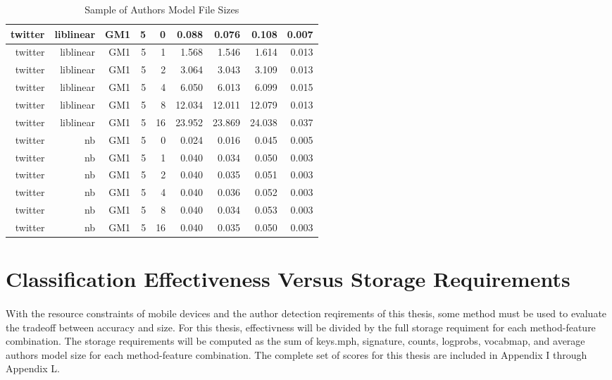 \begin{table}[htbp!]
\begin{center}
\begin{tabular}{ | r | r | r | r | r | r | r | r | r | }
		twitter & liblinear & GM1 & 5 & 0 & 0.088 & 0.076 & 0.108 & 0.007\\ \hline 
		twitter & liblinear & GM1 & 5 & 1 & 1.568 & 1.546 & 1.614 & 0.013\\ \hline 
		twitter & liblinear & GM1 & 5 & 2 & 3.064 & 3.043 & 3.109 & 0.013\\ \hline 
		twitter & liblinear & GM1 & 5 & 4 & 6.050 & 6.013 & 6.099 & 0.015\\ \hline 
		twitter & liblinear & GM1 & 5 & 8 & 12.034 & 12.011 & 12.079 & 0.013\\ \hline 
		twitter & liblinear & GM1 & 5 & 16 & 23.952 & 23.869 & 24.038 & 0.037\\ \hline 
		twitter & nb & GM1 & 5 & 0 & 0.024 & 0.016 & 0.045 & 0.005\\ \hline 
		twitter & nb & GM1 & 5 & 1 & 0.040 & 0.034 & 0.050 & 0.003\\ \hline 
		twitter & nb & GM1 & 5 & 2 & 0.040 & 0.035 & 0.051 & 0.003\\ \hline 
		twitter & nb & GM1 & 5 & 4 & 0.040 & 0.036 & 0.052 & 0.003\\ \hline 
		twitter & nb & GM1 & 5 & 8 & 0.040 & 0.034 & 0.053 & 0.003\\ \hline 
		twitter & nb & GM1 & 5 & 16 & 0.040 & 0.035 & 0.050 & 0.003\\ \hline 
		\end{tabular}
		\caption{Sample of Authors Model File Sizes}
		\label{tab:sample_authors_model_sizes}
		\end{center}
	\end{table}

\section{Classification Effectiveness Versus Storage Requirements}
\paragraph*{} With the resource constraints of mobile devices and the author detection reqirements of this thesis, some method must be used to evaluate the tradeoff between accuracy and size.  For this thesis, effectivness will be divided by the full storage requiment for each method-feature combination.  The storage requirements will be computed as the sum of keys.mph, signature, counts, logprobs, vocabmap, and average authors model size for each method-feature combination.  The complete set of scores for this thesis are included in Appendix I through Appendix L.  


